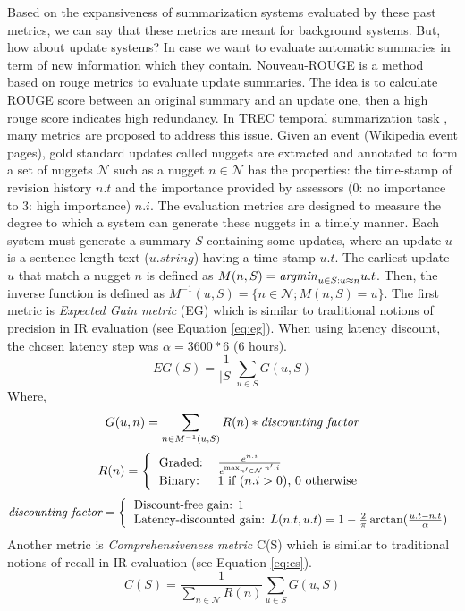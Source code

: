 Based on the expansiveness of summarization systems evaluated by these past metrics, we can say that these metrics are meant for background systems. 
But, how about update systems? In case we want to evaluate automatic summaries in term of new information which they contain.
Nouveau-ROUGE \citep{11-conroy-al} is a method based on \ac{rouge} metrics to evaluate update summaries. 
The idea is to calculate ROUGE score between an original summary and an update one, then a high \ac{rouge} score indicates high redundancy.
In TREC temporal summarization task \citep{13-aslam-al}, many metrics are proposed to address this issue. 
Given an event (Wikipedia event pages), gold standard updates called nuggets are extracted  and annotated to form a set of nuggets $ \mathcal{N} $ such as a nugget $ n \in \mathcal{N} $ has the properties: the time-stamp of revision history $ n.t $ and the importance provided by assessors (0: no importance to 3: high importance) $ n.i $. 
The evaluation metrics are designed to measure the degree to which a system can generate these nuggets in a timely manner.
Each system must generate a summary $ S $ containing some updates, where an update $ u $ is a sentence length text ($ u.string $) having a time-stamp $ u.t $.
The earliest update $ u $ that match a nugget $ n $ is defined as $ M(n, S) = \text{\textit{argmin}}_{u \in S: u \approx n} u.t $.
Then, the inverse function is defined as $ M^{-1}(u, S) = \{ n \in \mathcal{N}; M(n, S) = u \} $.
The first metric is \textit{Expected Gain metric} (EG) which is similar to traditional notions of precision in IR evaluation (see Equation \ref{eq:eg}). 
When using latency discount, the chosen latency step was $ \alpha = 3600 * 6$ (6 hours).
%
\begin{equation}
	\label{eq:eg}
	EG(S) = \frac{1}{|S|} \sum\limits_{u \in S} G(u, S)
\end{equation}
Where, 
\[
G(u, n) = \sum\limits_{n \in M^{-1} (u, S)} R(n) * \text{\textit{discounting factor}}
\]
\[
R(n) = \left\lbrace\begin{tabular}{ll}
Graded:& $ \frac{e^{n.i}}{e^{\max_{n' \in \mathcal{N}} n'.i}} $ \\
Binary:& $ 1 $ if  ($ n.i > 0 $), $ 0 $ otherwise
\end{tabular}\right.
\]
\[
\textit{discounting factor} = \left\lbrace\begin{tabular}{l}
Discount-free gain: $ 1 $ \\
Latency-discounted gain: $ L(n.t, u.t) = 1 - \frac{2}{\pi} \arctan(\frac{u.t - n.t}{\alpha}) $ 
\end{tabular}\right. 
\]
%
Another metric is \textit{Comprehensiveness metric} C(S) which is similar to traditional notions of recall in IR evaluation (see Equation \ref{eq:cs}).
\begin{equation}
	\label{eq:cs}
	C(S) = \frac{1}{\sum_{n \in \mathcal{N}} R(n)} \sum\limits_{u \in S} G(u, S)
\end{equation}


